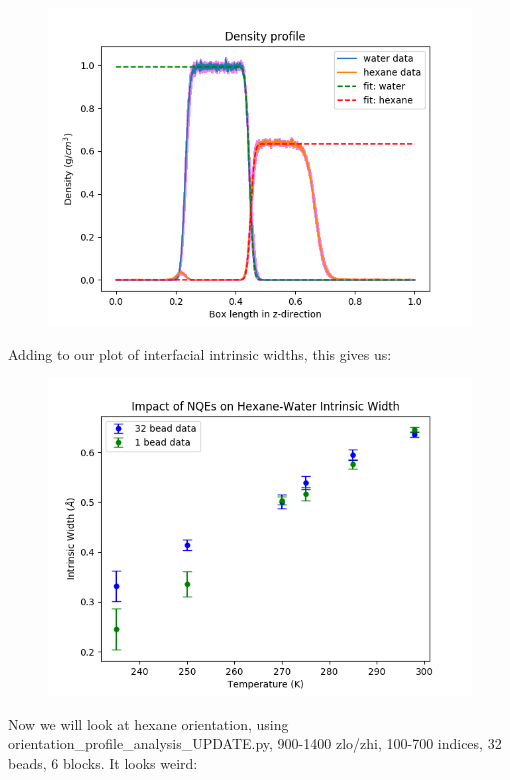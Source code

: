 \documentclass[12pt,reqno]{amsart}
\numberwithin{equation}{section}
\begin{document}
\begin{enumerate}
\begin{figure}[H]
\centering
\includegraphics[scale=0.6]{interface_density_profile_full-298-32bead-combined}
\end{figure}

Adding to our plot of interfacial intrinsic widths, this gives us:

\begin{figure}[H]
\centering
\includegraphics[scale=0.6]{intrinsic-width-32bead-vs-1bead-complete}
\end{figure}

Now we will look at hexane orientation, using orientation\_profile\_analysis\_UPDATE.py, 900-1400 zlo/zhi, 100-700 indices, 32 beads, 6 blocks.  It looks weird:


\end{enumerate}
\end{document}
